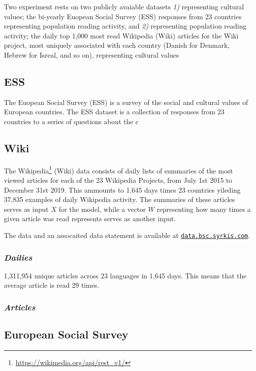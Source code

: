 Two experiment rests on two publicly avaiable datasets 
\emph{1)} representing cultural values; the bi-yearly Euopean Social Survey (ESS) responses from 23 countries
representing population reading activity, and
\emph{2)} representing population reading activity; the daily top 1,000 most read Wikipedia (Wiki) articles for the Wiki
project, most uniquely associated with each country
(Danish for Denmark, Hebrew for Isreal, and so on), representing cultural values

\subsection*{ESS}
The Euopean Social Survey (ESS) is a survey of the social and cultural values of European countries. 
The ESS dataset is a collection of responses from 23 countries to a series of questions about the c

\subsection*{Wiki}

The Wikipedia\footnote{\url{https://wikimedia.org/api/rest_v1/}} (Wiki) data consists of daily lists of summaries of the most viewed articles for each of the 23 Wikipedia Projects, from July 1st 2015 to December 31st 2019.
This ammounts to 1,645 days times 23 countries yileding 37,835 examples of daily Wikipedia activity.
The summaries of these articles serves as input $X$ for the model, while a vector $W$ representing how many times a given article was read represents serves as another input.

The data and an assocaited data statement is available at \href{https://data.bsc.syrkis.com}{\texttt{data.bsc.syrkis.com}}.

\subsubsection*{\emph{Dailies}}
1,311,954 unique articles across 23 languages in 1,645 days. This means that the average article is read 29 times.

\subsubsection*{\emph{Articles}}

\subsection*{European Social Survey}


